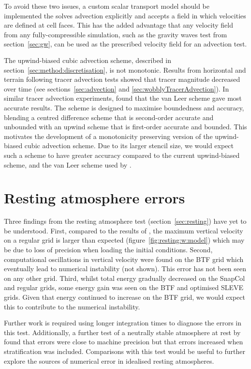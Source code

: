 To avoid these two issues, a custom scalar transport model should be implemented the solves advection explicitly and accepts a field in which velocities are defined at cell faces.  This has the added advantage that any velocity field from any fully-compressible simulation, such as the gravity waves test from section~\ref{sec:gw}, can be used as the prescribed velocity field for an advection test.

The upwind-biased cubic advection scheme, described in section~\ref{sec:method:discretisation}, is not monotonic.  Results from horizontal and terrain following tracer advection tests showed that tracer magnitude decreased over time (see sections~\ref{sec:advection} and \ref{sec:wobblyTracerAdvection}).
In similar tracer advection experiments, \textcite{jones2013} found that the van Leer scheme gave most accurate results.  The scheme is designed to maximise boundedness and accuracy, blending a centred difference scheme that is second-order accurate and unbounded with an upwind scheme that is first-order accurate and bounded.  This motivates the development of a monotonicity preserving version of the upwind-biased cubic advection scheme.  Due to its larger stencil size, we would expect such a scheme to have greater accuracy compared to the current upwind-biased scheme, and the van Leer scheme used by \textcite{jones2013}.

\section{Resting atmosphere errors}
\label{sec:further-work:resting}

Three findings from the resting atmosphere test (section~\ref{sec:resting}) have yet to be understood.  First, compared to the results of \textcite{good2013}, the maximum vertical velocity on a regular grid is larger than expected (figure~\ref{fig:resting:w:model}) which may be due to loss of precision when loading the initial conditions.
Second, computational oscillations in vertical velocity were found on the BTF grid which eventually lead to numerical instability (not shown).  This error has not been seen on any other grid.
Third, whilst total energy gradually decreased on the SnapCol and regular grids, some energy gain was seen on the BTF and optimised SLEVE grids.  Given that energy continued to increase on the BTF grid, we would expect this to contribute to the numerical instability.

Further work is required using longer integration times to diagnose the errors in this test.  Additionally, a further test of a neutrally stable atmosphere at rest by \textcite{botta2004} found that errors were close to machine precision but that errors increased when stratification was included.  Comparisons with this test would be useful to further explore the sources of numerical error in idealised resting atmospheres.

